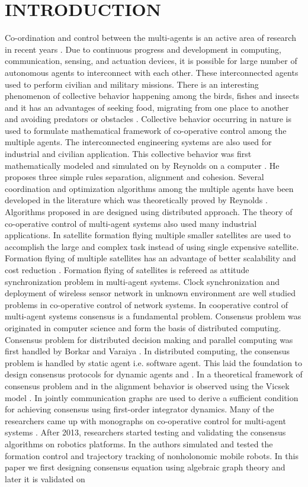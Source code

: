 \documentclass[twocolumn]{IETEJR}
\begin{document}
\section{INTRODUCTION}
Co-ordination and control between the multi-agents is an active area of research in recent years \cite{1}. Due to continuous progress and development in computing, communication, sensing, and actuation devices, it is possible for large number of autonomous agents to interconnect with each other. These interconnected agents used to perform civilian and military missions. There is an interesting phenomenon of collective behavior happening among the birds, fishes and insects and it has an advantages of seeking food, migrating from one place to another and avoiding predators or obstacles \cite{2}. Collective behavior occurring in nature is used to formulate mathematical framework of co-operative control among the multiple agents. The interconnected engineering systems are also used for industrial and civilian application. This collective behavior was first mathematically modeled and simulated on by Reynolds on a computer \cite{3}. He proposes three simple rules separation, alignment and cohesion. Several coordination and optimization algorithms among the multiple agents have been developed in the literature \cite{4,5} which was theoretically proved by Reynolds \cite{3}. Algorithms proposed in \cite{4,5} are designed using distributed approach. The theory of co-operative control of multi-agent systems also used many industrial applications. In satellite formation flying multiple smaller satellites are used to accomplish the large and complex task instead of using single expensive satellite. Formation flying of multiple satellites has an advantage of better scalability and cost reduction \cite{6}. Formation flying of satellites is refereed as attitude synchronization problem in multi-agent systems. Clock synchronization \cite{7} and deployment of wireless sensor network in unknown environment \cite{8} are well studied problems in co-operative control of network systems. In cooperative control of multi-agent systems consensus is a fundamental problem. Consensus problem was originated in computer science and form the basis of distributed computing.  Consensus problem for distributed decision making and parallel computing was first handled  by Borkar and Varaiya \cite{9}. In distributed computing, the consensus problem is handled by static agent i.e. software agent. This laid the foundation to design consensus protocols for dynamic agents \cite{10} and \cite{11}. In \cite{10} a theoretical framework of consensus problem and in \cite{11}  the alignment behavior is observed using the Vicsek model \cite{12}. In \cite{13} jointly communication graphs are used to derive a sufficient condition for achieving consensus using first-order integrator dynamics. Many of the researchers came up with monographs on co-operative control for multi-agent systems  \cite{14,15,16,17}. After 2013, researchers started testing and validating the consensus algorithms on robotics platforms. In \cite{18} the authors simulated and tested the formation control and trajectory tracking of nonholonomic mobile robots. In this paper we first designing consensus equation using algebraic graph theory and later it is validated on 
\end{document}
